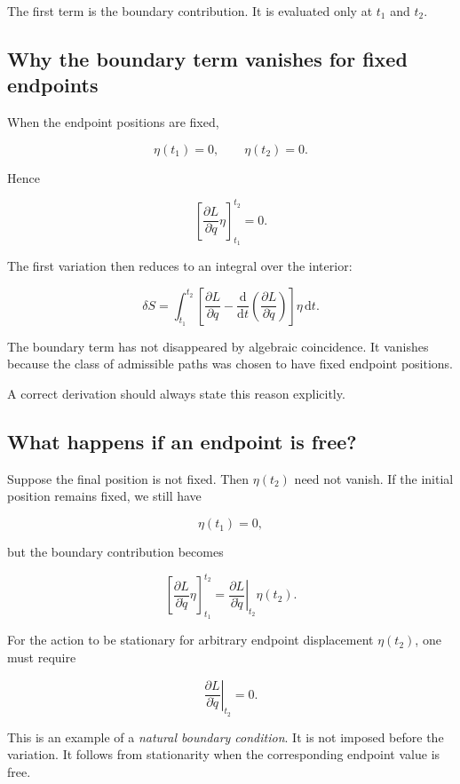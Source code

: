 The first term is the boundary contribution. It is evaluated only at \(t_{1}\) and \(t_{2}\).

\subsection{Why the boundary term vanishes for fixed endpoints}

When the endpoint positions are fixed,

\[
\eta(t_{1})=0,
\qquad
\eta(t_{2})=0.
\]

Hence

\[
\left[
\frac{\partial L}{\partial\dot q}\eta
\right]_{t_{1}}^{t_{2}}
=
0.
\]

The first variation then reduces to an integral over the interior:

\[
\delta S
=
\int_{t_{1}}^{t_{2}}
\left[
\frac{\partial L}{\partial q}
-
\frac{\mathrm{d}}{\mathrm{d}t}
\left(
\frac{\partial L}{\partial\dot q}
\right)
\right]
\eta
\,\mathrm{d}t.
\]

The boundary term has not disappeared by algebraic coincidence. It vanishes because the class of admissible paths was chosen to have fixed endpoint positions.

A correct derivation should always state this reason explicitly.

\subsection{What happens if an endpoint is free?}

Suppose the final position is not fixed. Then \(\eta(t_{2})\) need not vanish. If the initial position remains fixed, we still have

\[
\eta(t_{1})=0,
\]

but the boundary contribution becomes

\[
\left[
\frac{\partial L}{\partial\dot q}\eta
\right]_{t_{1}}^{t_{2}}
=
\left.
\frac{\partial L}{\partial\dot q}
\right|_{t_{2}}
\eta(t_{2}).
\]

For the action to be stationary for arbitrary endpoint displacement \(\eta(t_{2})\), one must require

\[
\boxed{
\left.
\frac{\partial L}{\partial\dot q}
\right|_{t_{2}}
=0
}.
\]

This is an example of a \emph{natural boundary condition}. It is not imposed before the variation. It follows from stationarity when the corresponding endpoint value is free.

